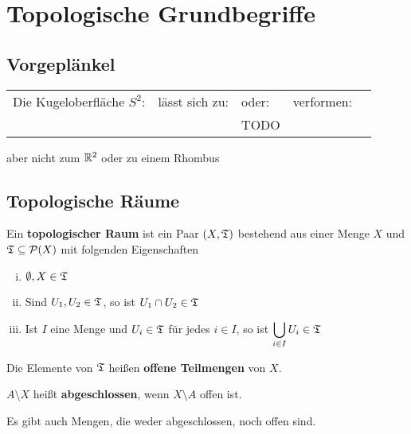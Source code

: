 \chapter{Topologische Grundbegriffe}
\section{Vorgeplänkel}
    \begin{tabular}{lllll}
    Die Kugeloberfläche $S^2$: &  lässt sich zu:          & oder:& verformen: \\
         &  & TODO & 
    \end{tabular}

    aber nicht zum $\mathbb{R}^2$ oder zu einem Rhombus

    

\section{Topologische Räume}
\begin{definition}   
    Ein \textbf{topologischer Raum} ist ein Paar $(X, \mathfrak{T})$ bestehend
    aus einer Menge $X$ und $\mathfrak{T} \subseteq \mathcal{P}(X)$ mit
    folgenden Eigenschaften
    \begin{enumerate}[(i)]
        \item $\emptyset, X \in \mathfrak{T}$
        \item Sind $U_1, U_2 \in \mathfrak{T}$, so ist $U_1 \cap U_2 \in \mathfrak{T}$
        \item Ist $I$ eine Menge und $U_i \in \mathfrak{T}$ für jedes $i \in I$,
              so ist $\displaystyle \bigcup_{i \in I} U_i \in \mathfrak{T}$
    \end{enumerate}
    Die Elemente von $\mathfrak{T}$ heißen \textbf{offene Teilmengen} von $X$. 

    $A \setminus X$ heißt \textbf{abgeschlossen}, wenn $X \setminus A$ offen ist.

\end{definition}

Es gibt auch Mengen, die weder abgeschlossen, noch offen sind.

